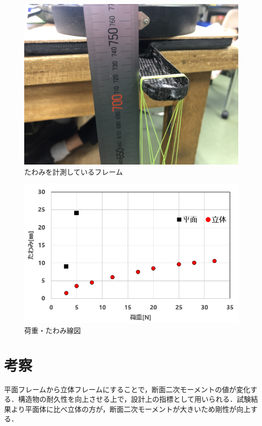\begin{figure}[htbp]
  \begin{center}
    \includegraphics[width=120mm]{img/２９.JPG}
    \end{center}
  \caption{たわみを計測しているフレーム}
 \label{fig:robot}
\end{figure}

\begin{figure}[htbp]
  \begin{center}
    \includegraphics[width=120mm]{img/２２.png}
    \end{center}
  \caption{荷重・たわみ線図}
 \label{fig:robot}
\end{figure}

\section{考察}
平面フレームから立体フレームにすることで，断面二次モーメントの値が変化する．構造物の耐久性を向上させる上で，設計上の指標として用いられる．試験結果より平面体に比べ立体の方が，断面二次モーメントが大きいため剛性が向上する．